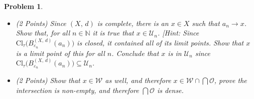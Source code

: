 \documentclass{article}
\theoremstyle{normal}
\newtheorem{problem}{Problem}
\begin{document}
\begin{problem}
\begin{itemize}
                such that
                $B_{r_{0}}^{(X,\,d)}(a_{0})\subseteq\mathcal{U}_{0}\cap\mathcal{W}$.
                By the previous part of the problem, there is a positive
                $\varepsilon<r_{0}$ such that
                $\textrm{Cl}_{\tau_{d}}\big(B_{\varepsilon_{0}}^{(X,\,d)}(a_{0})\big)\subseteq{B}_{r_{0}}^{(X,\,d)}(a_{0})$.
                Recursively we may define $a_{n}$, $r_{n}$, and
                $\varepsilon_{n}$ such that $r_{n}<\frac{1}{n+1}$,
                $\varepsilon_{n}<r_{n}$, and $a_{n}$ is such that:
                \begin{equation}
                    \textrm{Cl}_{\tau_{d}}
                        \big(B_{\varepsilon_{n}}^{(X,\,d)}(a_{n})\big)
                    \subseteq{B}_{r_{n}}^{(X,\,d)}(a_{n})
                    \subseteq\mathcal{W}\cap\bigcap_{k=0}^{n}\mathcal{U}_{n}
                \end{equation}
                Show that $a:\mathbb{N}\rightarrow{X}$ is a Cauchy sequence.
            \item (2 Points) Since $(X,\,d)$ is complete, there is an $x\in{X}$ such that
                $a_{n}\rightarrow{x}$. Show that, for all $n\in\mathbb{N}$ it
                is true that $x\in\mathcal{U}_{n}$.
                [Hint: Since $\textrm{Cl}_{\tau}\big(B_{\varepsilon_{n}}^{(X,\,d)}(a_{n})\big)$
                is closed, it contained all of its limit points. Show that
                $x$ is a limit point of this for all $n$. Conclude that
                $x$ is in $\mathcal{U}_{n}$ since
                $\textrm{Cl}_{\tau}\big(B_{\varepsilon_{n}}^{(X,\,d)}(a_{n})\big)\subseteq\mathcal{U}_{n}$.
            \item (2 Points) Show that $x\in\mathcal{W}$ as well, and therefore
                $x\in\mathcal{W}\cap\bigcap\mathcal{O}$, prove the intersection
                is non-empty, and therefore $\bigcap\mathcal{O}$ is dense.
        \end{itemize}
    \end{problem}
\end{document}

